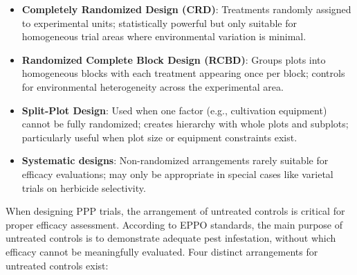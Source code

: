 \documentclass[12pt,a4paper,oneside]{report}
\begin{document}
\begin{itemize}
    \item \textbf{Completely Randomized Design (CRD)}: Treatments randomly assigned to 
          experimental units; statistically powerful but only suitable for homogeneous trial 
          areas where environmental variation is minimal.
          
    \item \textbf{Randomized Complete Block Design (RCBD)}: Groups plots into homogeneous 
          blocks with each treatment appearing once per block; controls for environmental 
          heterogeneity across the experimental area.
          
    \item \textbf{Split-Plot Design}: Used when one factor (e.g., cultivation equipment) 
          cannot be fully randomized; creates hierarchy with whole plots and subplots; 
          particularly useful when plot size or equipment constraints exist.
          
    \item \textbf{Systematic designs}: Non-randomized arrangements rarely suitable for 
          efficacy evaluations; may only be appropriate in special cases like varietal 
          trials on herbicide selectivity.
\end{itemize}

When designing PPP trials, the arrangement of untreated controls 
is critical for proper efficacy assessment. According to EPPO standards, the main 
purpose of untreated controls is to demonstrate adequate pest infestation, without 
which efficacy cannot be meaningfully evaluated. Four distinct arrangements for 
untreated controls exist:
\end{document}
